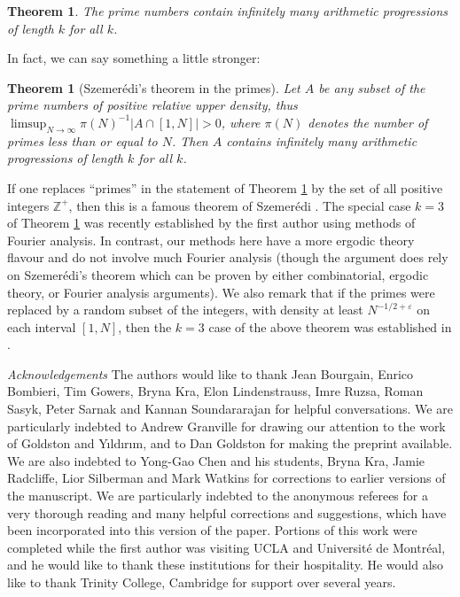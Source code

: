 \documentclass[12pt,a4paper,reqno]{amsart}
\numberwithin{equation}{section}
\theoremstyle{plain}
\newtheorem{theorem}[subsection]{Theorem}
\theoremstyle{definition}
\def\Z{{\mathbb Z}}
\def\eps{{\varepsilon}}
\def\vs{\vspace{11pt}}
\def\ni{\noindent}
\begin{document}
\begin{theorem}\label{mainthm} The prime numbers contain infinitely many arithmetic progressions of length $k$ for all $k$.  
\end{theorem}

\ni In fact, we can say something a little stronger:

\begin{theorem}[Szemer\'edi's theorem in the primes]\label{sz-primes} Let $A$ be any subset of the prime numbers of positive relative upper density, thus $\limsup_{N \to \infty} \pi(N)^{-1}|A \cap [1,N]| > 0$, where $\pi(N)$ denotes the number of primes less than or equal to $N$.  Then $A$ contains infinitely many arithmetic progressions of length $k$ for all $k$.
\end{theorem}

\ni If one replaces ``primes'' in the statement of Theorem \ref{sz-primes} by the set of all positive integers $\Z^+$, then this is a famous theorem of Szemer\'edi \cite{szemeredi}. The special case $k = 3$ of Theorem \ref{sz-primes} was recently established by the first author \cite{green} using methods of Fourier analysis.  In contrast, our
methods here have a more ergodic theory flavour and do not involve much Fourier analysis (though the argument does rely on Szemer\'edi's theorem which can be proven by either combinatorial, ergodic theory, or Fourier analysis arguments).  We also remark that if the primes were replaced
 by a random subset of the integers, with density at least $N^{-1/2+\eps}$ on each interval $[1,N]$, then the $k=3$ case of the above theorem was established in \cite{klr}.  
\vs

\ni\textit{Acknowledgements} The authors would like to thank Jean Bourgain, Enrico Bombieri, Tim Gowers, Bryna Kra, Elon Lindenstrauss, Imre Ruzsa, Roman Sasyk, Peter Sarnak and Kannan Soundararajan for helpful conversations. We are particularly indebted to Andrew Granville for drawing our attention to the work of Goldston and Y{\i}ld{\i}r{\i}m, and to Dan Goldston for making the preprint \cite{goldston-yildirim} available. We are also indebted to Yong-Gao Chen and his students, Bryna Kra, Jamie Radcliffe, Lior Silberman and Mark Watkins for corrections to earlier versions of the manuscript.  We are 
particularly indebted to the anonymous referees for a very thorough reading and many helpful corrections and suggestions, which have
been incorporated into this version of the paper.
Portions of this work were completed while the first author was visiting UCLA and Universit\'e de Montr\'eal, and he would like to thank these institutions for their hospitality. He would also like to thank Trinity College, Cambridge for support over several years.
\end{document}

